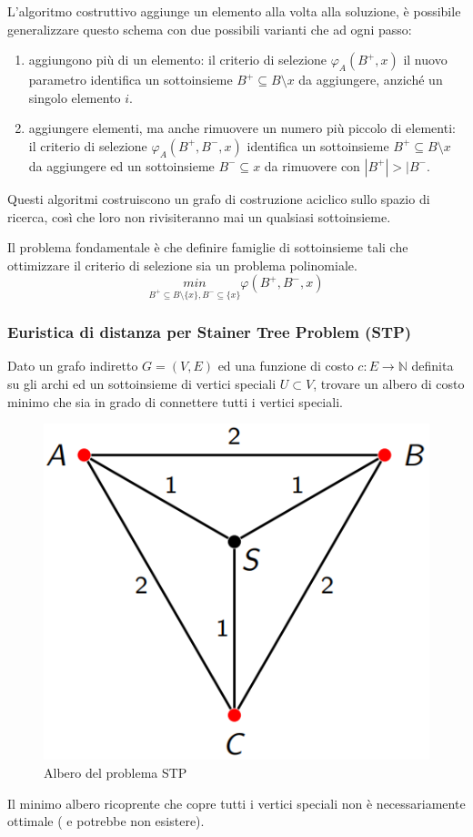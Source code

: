 \documentclass{article}
\begin{document}
L'algoritmo costruttivo aggiunge un elemento alla volta alla soluzione, è possibile
generalizzare questo schema con due possibili varianti che ad ogni passo:
\begin{enumerate}
    \item aggiungono più di un elemento: il criterio di selezione $\varphi_A(B^+,x)$
          il nuovo parametro identifica un sottoinsieme $B^+\subseteq B\setminus x$ da aggiungere, anziché un singolo elemento $i$.

    \item aggiungere elementi, ma anche rimuovere un numero più piccolo di elementi: il
          criterio di selezione $\varphi_A(B^+,B^-,x)$ identifica un sottoinsieme $B^+\subseteq B\setminus x$
          da aggiungere ed un sottoinsieme $B^-\subseteq x$ da rimuovere con $|B^+|>|B^-$.
\end{enumerate}

Questi algoritmi costruiscono un grafo di costruzione aciclico sullo spazio di ricerca, così
che loro non rivisiteranno mai un qualsiasi sottoinsieme.

Il problema fondamentale è che definire famiglie di sottoinsieme tali che ottimizzare il criterio
di selezione sia un problema polinomiale.
$$\underset{B^+\subseteq B\setminus \{x\}, B^- \subseteq \{x\}}{min}\varphi(B^+, B^-,x)$$

\subsubsection{Euristica di distanza per Stainer Tree Problem (STP)}
Dato un grafo indiretto $G=(V,E)$ ed una funzione di costo $c:E\rightarrow\mathbb{N}$ definita
su gli archi ed un sottoinsieme di vertici speciali $U\subset V$, trovare un albero
di costo minimo che sia in grado di connettere tutti i vertici speciali.

\begin{figure}[H]
    \centering
    \includegraphics[scale=0.5]{images/stp.png}
    \caption{Albero del problema STP}
\end{figure}
Il minimo albero ricoprente che copre tutti i vertici speciali non è necessariamente ottimale (
e potrebbe non esistere).
\end{document}
